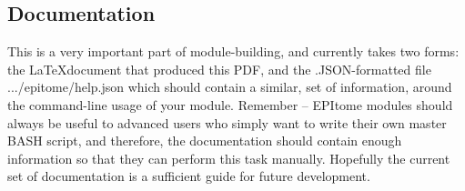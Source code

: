 \documentclass[final,titlepage,letterpaper,oneside,12pt]{article}
\renewcommand{\texttt}[2][BrickRed]{\textcolor{#1}{\ttfamily #2}}%
\begin{document}
\subsection{Documentation}

This is a very important part of module-building, and currently takes two forms: the \LaTeX document that produced this PDF, and the .JSON-formatted file \texttt{.../epitome/help.json} which should contain a similar, set of information, around the command-line usage of your module. Remember -- EPItome modules should always be useful to advanced users who simply want to write their own master BASH script, and therefore, the documentation should contain enough information so that they can perform this task manually. Hopefully the current set of documentation is a sufficient guide for future development.

\newpage 


\end{document}
